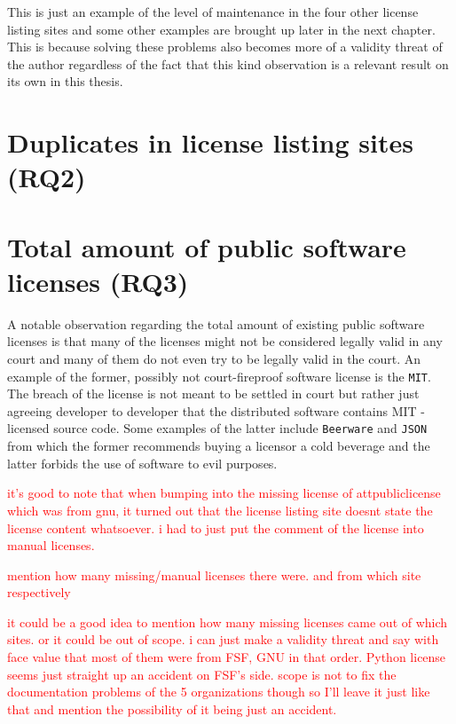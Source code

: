 This is just an example of the level of maintenance in the four other license listing sites and some other examples are brought up later in the next chapter. This is because solving these problems also becomes more of a validity threat of the author regardless of the fact that this kind observation is a relevant result on its own in this thesis.
\section{Duplicates in license listing sites (RQ2)}
\section{Total amount of public software licenses (RQ3)}

A notable observation regarding the total amount of existing public software licenses is that many of the licenses might not be considered legally valid in any court and many of them do not even try to be legally valid in the court. An example of the former, possibly not court-fireproof software license is the \texttt{MIT}. The breach of the license is not meant to be settled in court but rather just agreeing developer to developer that the distributed software contains MIT -licensed source code. Some examples of the latter include \texttt{Beerware} and \texttt{JSON} from which the former recommends buying a licensor a cold beverage and the latter forbids the use of software to evil purposes. 


\textcolor{red}{it's good to note that when bumping into the missing license of attpubliclicense which was from gnu, it turned out that the license listing site doesnt state the license content whatsoever. i had to just put the comment of the license into manual licenses.}

\textcolor{red}{mention how many missing/manual licenses there were. and from which site respectively}

\textcolor{red}{it could be a good idea to mention how many missing licenses came out of which sites. or it could be out of scope. i can just make a validity threat and say with face value that most of them were from FSF, GNU in that order. Python license seems just straight up an accident on FSF's side. scope is not to fix the documentation problems of the 5 organizations though so I'll leave it just like that and mention the possibility of it being just an accident.}

